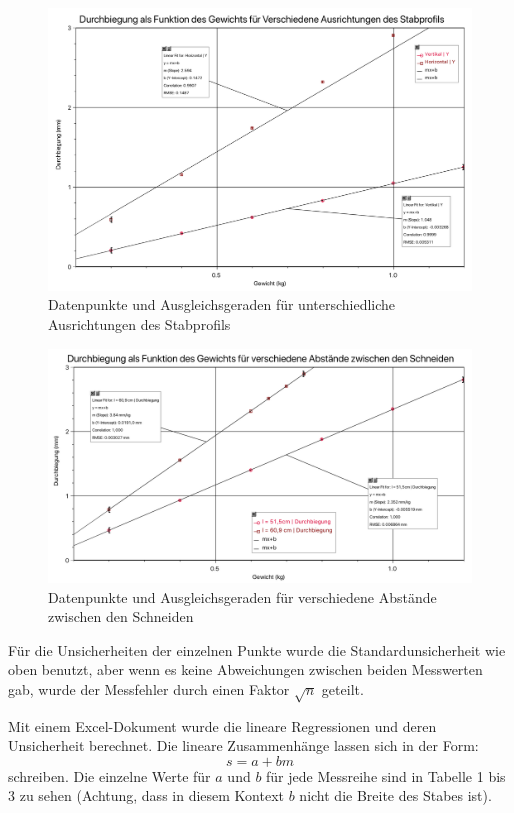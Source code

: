 \documentclass[11pt,a4paper]{article}
\begin{document}
\begin{figure}[h]
	\centering
	\includegraphics[width=\linewidth]{Abb3}
	\caption{Datenpunkte und Ausgleichsgeraden für unterschiedliche Ausrichtungen des Stabprofils}
\end{figure}

\begin{figure}[h]
	\centering
	\includegraphics[width=\linewidth]{Abb4}
	\caption{Datenpunkte und Ausgleichsgeraden für verschiedene Abstände zwischen den Schneiden}
\end{figure}
\FloatBarrier

	Für die Unsicherheiten der einzelnen Punkte wurde die Standardunsicherheit wie oben benutzt, aber wenn es keine Abweichungen zwischen beiden Messwerten gab, wurde der Messfehler durch einen Faktor $\sqrt{n}$ geteilt. 

Mit einem Excel-Dokument wurde die lineare Regressionen und deren Unsicherheit berechnet. Die lineare Zusammenhänge lassen sich in der Form: 
$$ s = a + bm $$ schreiben. Die einzelne Werte für $a$ und $b$ für jede Messreihe sind in Tabelle 1 bis 3 zu sehen (Achtung, dass in diesem Kontext $b$ nicht die Breite des Stabes ist). 
\end{document}
